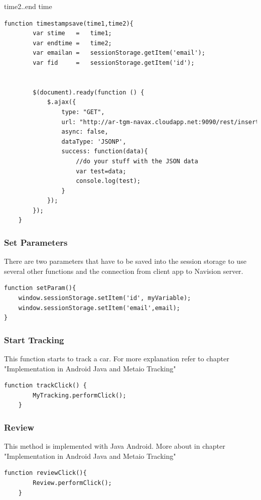 time2..end time
\\
\begin{lstlisting}[language=html, caption= 
start timer function,captionpos=b]
function timestampsave(time1,time2){
        var stime	= 	time1;
        var endtime	=	time2;
        var emailan = 	sessionStorage.getItem('email');
        var fid 	= 	sessionStorage.getItem('id');
        

        $(document).ready(function () {
            $.ajax({
                type: "GET",
                url: "http://ar-tgm-navax.cloudapp.net:9090/rest/insertTrackingHistory/"+emailan+"/"+fid+"/"+stime+"/"+endtime+"/ac73f229f1fb88a8719e5f6d295bee45?callback=?",
                async: false,
                dataType: 'JSONP',
                success: function(data){
                    //do your stuff with the JSON data
                    var test=data;
                    console.log(test);
                }
            });
        });
    }
\end{lstlisting}


\subsubsection{Set Parameters}
There are two parameters that have to be saved into the session storage to use several other functions and the connection from client app to Navision server.
\\
\begin{lstlisting}[language=html, caption= 
start timer function,captionpos=b]
function setParam(){
	window.sessionStorage.setItem('id', myVariable);
	window.sessionStorage.setItem('email',email);
}
\end{lstlisting}




\subsubsection{Start Tracking}
This function starts to track a car. For more explanation refer to chapter "Implementation in Android Java and Metaio Tracking"
\\

\begin{lstlisting}[language=html, caption= 
start timer function,captionpos=b]
function trackClick() {
        MyTracking.performClick();
    }
\end{lstlisting}

\subsubsection{Review}
This method is implemented with Java Android. More about in chapter "Implementation in Android Java and Metaio Tracking"
\\
\begin{lstlisting}[language=html, caption= 
start timer function,captionpos=b]
function reviewClick(){
        Review.performClick();
    }
\end{lstlisting}


